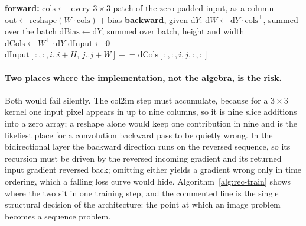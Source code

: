 \begin{algorithm}[!htbp]
\caption{The convolution and its gradient; the col2im step must accumulate}
\label{alg:rec-conv}
\begin{algorithmic}[1]
\STATE \textbf{forward:}
\STATE \quad $\mathrm{cols}\leftarrow$ every $3\times3$ patch of the zero-padded input, as a column
\STATE \quad $\mathrm{out}\leftarrow\mathrm{reshape}(W\cdot\mathrm{cols})+\mathrm{bias}$ 
\STATE \textbf{backward}, given $\mathrm dY$:
\STATE \quad $\mathrm dW\leftarrow \mathrm dY\cdot\mathrm{cols}^{\top}$, summed over the batch
\STATE \quad $\mathrm{dBias}\leftarrow \mathrm dY$, summed over batch, height and width
\STATE \quad $\mathrm{dCols}\leftarrow W^{\top}\cdot\mathrm dY$
\STATE \quad $\mathrm{dInput}\leftarrow\mathbf 0$
        \STATE $\mathrm{dInput}[:,:,i..i{+}H,\,j..j{+}W]\mathrel{+}=\mathrm{dCols}[:,:,i,j,:,:]$ 
    \ENDFOR
\ENDFOR
\end{algorithmic}
\end{algorithm}

\paragraph{Two places where the implementation, not the algebra, is the risk.}
Both would fail silently. The col2im step must accumulate, because for a $3\times3$ kernel one input pixel appears in up to nine columns, so it is nine slice additions into a zero array; a reshape alone would keep one contribution in nine and is the likeliest place for a convolution backward pass to be quietly wrong. In the bidirectional layer the backward direction runs on the reversed sequence, so its recursion must be driven by the reversed incoming gradient and its returned input gradient reversed back; omitting either yields a gradient wrong only in time ordering, which a falling loss curve would hide. Algorithm~\ref{alg:rec-train} shows where the two sit in one training step, and the commented line is the single structural decision of the architecture: the point at which an image problem becomes a sequence problem.

